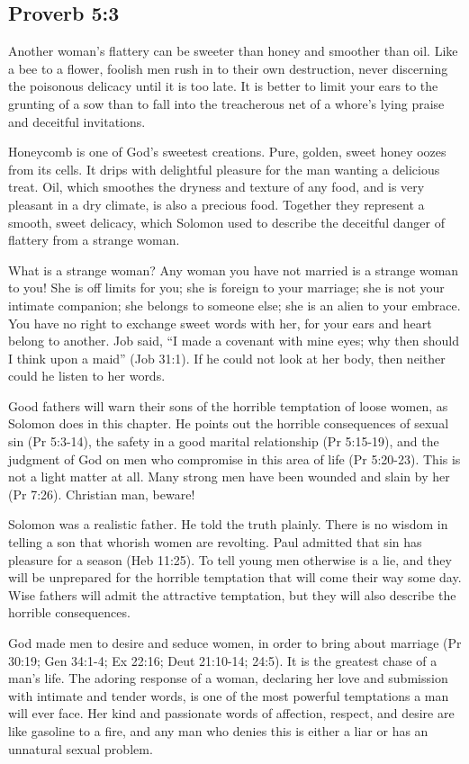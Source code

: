 \subsection{Proverb 5:3}
Another woman’s flattery can be sweeter than honey and smoother than oil. Like a bee to a flower, foolish men rush in to their own destruction, never discerning the poisonous delicacy until it is too late. It is better to limit your ears to the grunting of a sow than to fall into the treacherous net of a whore’s lying praise and deceitful invitations.

Honeycomb is one of God’s sweetest creations. Pure, golden, sweet honey oozes from its cells. It drips with delightful pleasure for the man wanting a delicious treat. Oil, which smoothes the dryness and texture of any food, and is very pleasant in a dry climate, is also a precious food. Together they represent a smooth, sweet delicacy, which Solomon used to describe the deceitful danger of flattery from a strange woman.

What is a strange woman? Any woman you have not married is a strange woman to you! She is off limits for you; she is foreign to your marriage; she is not your intimate companion; she belongs to someone else; she is an alien to your embrace. You have no right to exchange sweet words with her, for your ears and heart belong to another. Job said, “I made a covenant with mine eyes; why then should I think upon a maid” (Job 31:1). If he could not look at her body, then neither could he listen to her words.

Good fathers will warn their sons of the horrible temptation of loose women, as Solomon does in this chapter. He points out the horrible consequences of sexual sin (Pr 5:3-14), the safety in a good marital relationship (Pr 5:15-19), and the judgment of God on men who compromise in this area of life (Pr 5:20-23). This is not a light matter at all. Many strong men have been wounded and slain by her (Pr 7:26). Christian man, beware!

Solomon was a realistic father. He told the truth plainly. There is no wisdom in telling a son that whorish women are revolting. Paul admitted that sin has pleasure for a season (Heb 11:25). To tell young men otherwise is a lie, and they will be unprepared for the horrible temptation that will come their way some day. Wise fathers will admit the attractive temptation, but they will also describe the horrible consequences.

God made men to desire and seduce women, in order to bring about marriage (Pr 30:19; Gen 34:1-4; Ex 22:16; Deut 21:10-14; 24:5). It is the greatest chase of a man’s life. The adoring response of a woman, declaring her love and submission with intimate and tender words, is one of the most powerful temptations a man will ever face. Her kind and passionate words of affection, respect, and desire are like gasoline to a fire, and any man who denies this is either a liar or has an unnatural sexual problem.

